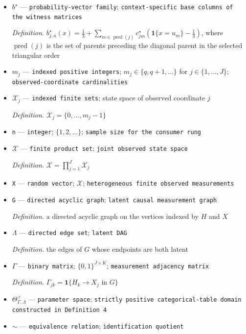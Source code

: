 \documentclass{article}
\begin{document}
\begin{itemize}
  \item \(b^{\star}\) --- \texttt{probability-\allowbreak{}vector family}; \texttt{context-\allowbreak{}specific base columns of the witness matrices}
  \par\smallskip\noindent\emph{Definition.} \(b^{\star}_{j,u}(x)=\frac13+\sum_{m\in\operatorname{pred}(j)}c^{\star}_{jm}(\mathbf1\{x=u_m\}-\frac13)\), where \(\operatorname{pred}(j)\) is the set of parents preceding the diagonal parent in the selected triangular order
  \item \(m_j\) --- \texttt{indexed positive integers}; \(m_j\in\{q,q+1,\ldots\}\) for \(j\in\{1,\ldots,J\}\); \texttt{observed-\allowbreak{}coordinate cardinalities}
  \item \(\mathcal X_j\) --- \texttt{indexed finite sets}; state space of observed coordinate \(j\)
  \par\smallskip\noindent\emph{Definition.} \(\mathcal X_j=\{0,\ldots,m_j-1\}\)
  \item \texttt{n} --- \texttt{integer}; \(\{1,2,\ldots\}\); \texttt{sample size for the consumer rung}
  \item \(\mathcal X\) --- \texttt{finite product set}; \texttt{joint observed state space}
  \par\smallskip\noindent\emph{Definition.} \(\mathcal X=\prod_{j=1}^J\mathcal X_j\)
  \item \texttt{X} --- \texttt{random vector}; \(\mathcal X\); \texttt{heterogeneous finite observed measurements}
  \item \texttt{G} --- \texttt{directed acyclic graph}; \texttt{latent causal measurement graph}
  \par\smallskip\noindent\emph{Definition.} a directed acyclic graph on the vertices indexed by \(H\) and \(X\)
  \item \(\Lambda\) --- \texttt{directed edge set}; \texttt{latent DAG}
  \par\smallskip\noindent\emph{Definition.} the edges of \(G\) whose endpoints are both latent
  \item \(\Gamma\) --- \texttt{binary matrix}; \(\{0,1\}^{J\times K}\); \texttt{measurement adjacency matrix}
  \par\smallskip\noindent\emph{Definition.} \(\Gamma_{jk}=\mathbf 1\{H_k\to X_j\text{ in }G\}\)
  \item \(\Theta_{\Gamma,\Lambda}^{+}\) --- \texttt{parameter space}; \texttt{strictly positive categorical-\allowbreak{}table domain constructed in Definition 4}
  \item \(\sim\) --- \texttt{equivalence relation}; \texttt{identification quotient}

\end{itemize}
\end{document}
